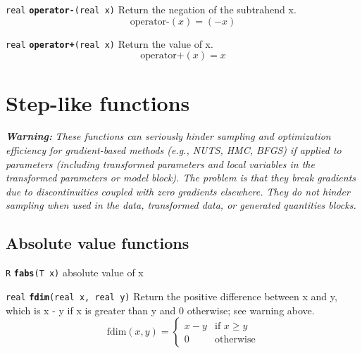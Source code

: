 \documentclass[
  10pt,
]{book}
\begin{document}

\texttt{real} \textbf{\texttt{operator-}}\texttt{(real\ x)}\newline
Return the negation of the subtrahend x. \[ \text{operator-}(x) = (-x)
\]


\texttt{real} \textbf{\texttt{operator+}}\texttt{(real\ x)}\newline
Return the value of x. \[ \text{operator+}(x) = x \]

\hypertarget{step-functions}{%
\section{Step-like functions}\label{step-functions}}

\emph{\textbf{Warning:}} \emph{These functions can seriously hinder sampling and
optimization efficiency for gradient-based methods (e.g., NUTS, HMC,
BFGS) if applied to parameters (including transformed parameters and
local variables in the transformed parameters or model block). The
problem is that they break gradients due to discontinuities coupled
with zero gradients elsewhere. They do not hinder sampling when
used in the data, transformed data, or generated quantities blocks.}

\hypertarget{absolute-value-functions}{%
\subsection{Absolute value functions}\label{absolute-value-functions}}


\texttt{R} \textbf{\texttt{fabs}}\texttt{(T\ x)}\newline
absolute value of x


\texttt{real} \textbf{\texttt{fdim}}\texttt{(real\ x,\ real\ y)}\newline
Return the positive difference between x and y, which is x - y if x is
greater than y and 0 otherwise; see warning above.
\[ \text{fdim}(x,y) = \begin{cases} x-y &
\text{if } x \geq y \\ 0 & \text{otherwise} \end{cases} \]
\end{document}
